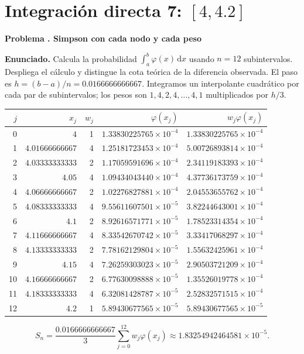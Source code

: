 \documentclass[11pt,a4paper]{article}
\newcommand{\dd}{\,\mathrm d}
\theoremstyle{definition}
\newcounter{problema}
\newenvironment{resuelto}[1]{\refstepcounter{problema}\par\medskip\Needspace{6\baselineskip}\textbf{Problema \theproblema. #1}\par}{\par\medskip}
\begin{document}
\section{\texorpdfstring{Integración directa 7: $[4,4.2]$}{Integración directa 7: [4,4.2]}}
\begin{resuelto}{Simpson con cada nodo y cada peso}
\textbf{Enunciado.} Calcula la probabilidad $\int_a^b\varphi(x)\dd x$ usando $n=12$ subintervalos. Despliega el cálculo y distingue la cota teórica de la diferencia observada.
El paso es $h=(b-a)/n=0.0166666666667$. Integramos un interpolante cuadrático por cada par de subintervalos; los pesos son $1,4,2,4,\ldots,4,1$ multiplicados por $h/3$.

\begin{center}\small\begin{tabular}{rrrrr}
\toprule
$j$&$x_j$&$w_j$&$\varphi(x_j)$&$w_j\varphi(x_j)$\\
\midrule
0&$4$&1&$1.33830225765\times10^{-4}$&$1.33830225765\times10^{-4}$\\
1&$4.01666666667$&4&$1.25181723453\times10^{-4}$&$5.00726893814\times10^{-4}$\\
2&$4.03333333333$&2&$1.17059591696\times10^{-4}$&$2.34119183393\times10^{-4}$\\
3&$4.05$&4&$1.09434043440\times10^{-4}$&$4.37736173759\times10^{-4}$\\
4&$4.06666666667$&2&$1.02276827881\times10^{-4}$&$2.04553655762\times10^{-4}$\\
5&$4.08333333333$&4&$9.55611607501\times10^{-5}$&$3.82244643001\times10^{-4}$\\
6&$4.1$&2&$8.92616571771\times10^{-5}$&$1.78523314354\times10^{-4}$\\
7&$4.11666666667$&4&$8.33542670742\times10^{-5}$&$3.33417068297\times10^{-4}$\\
8&$4.13333333333$&2&$7.78162129804\times10^{-5}$&$1.55632425961\times10^{-4}$\\
9&$4.15$&4&$7.26259303023\times10^{-5}$&$2.90503721209\times10^{-4}$\\
10&$4.16666666667$&2&$6.77630098888\times10^{-5}$&$1.35526019778\times10^{-4}$\\
11&$4.18333333333$&4&$6.32081428787\times10^{-5}$&$2.52832571515\times10^{-4}$\\
12&$4.2$&1&$5.89430677565\times10^{-5}$&$5.89430677565\times10^{-5}$\\
\bottomrule\end{tabular}\end{center}
\[
S_n=\frac{0.0166666666667}{3}\sum_{j=0}^{12}w_j\varphi(x_j)\approx1.83254942464581\times10^{-5}.
\]
\end{resuelto}
\end{document}
